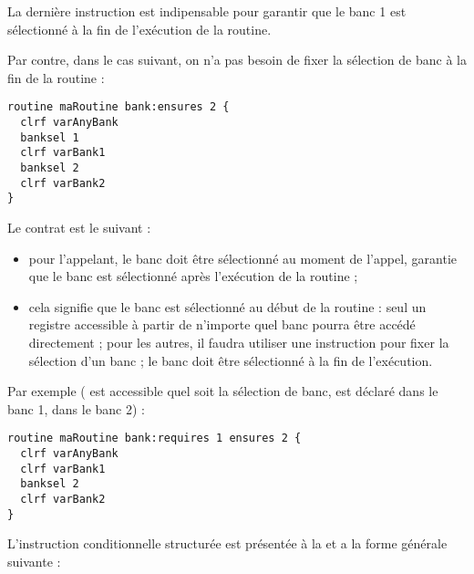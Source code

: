 La dernière instruction  est indipensable pour garantir que le banc 1 est sélectionné à la fin de l'exécution de la routine.


Par contre, dans le cas suivant, on n'a pas besoin de fixer la sélection de banc à la fin de la routine :
\begin{lstlisting}[language=piccolo]
routine maRoutine bank:ensures 2 {
  clrf varAnyBank
  banksel 1
  clrf varBank1
  banksel 2
  clrf varBank2
}
\end{lstlisting}













Le contrat est le suivant :
\begin{itemize}
  \item pour l'appelant, le banc  doit être sélectionné au moment de l'appel, garantie que le banc  est sélectionné après l'exécution de la routine ; 
  \item cela signifie que le banc  est sélectionné au début de la routine : seul un registre accessible à partir de n'importe quel banc pourra être accédé directement ; pour les autres, il faudra utiliser une instruction  pour fixer la sélection d'un banc ; le banc  doit être sélectionné à la fin de l'exécution.
\end{itemize}

Par exemple ( est accessible quel soit la sélection de banc,  est déclaré dans le banc 1,  dans le banc 2) :
\begin{lstlisting}[language=piccolo]
routine maRoutine bank:requires 1 ensures 2 {
  clrf varAnyBank
  clrf varBank1
  banksel 2
  clrf varBank2
}
\end{lstlisting}










L'instruction conditionnelle structurée est présentée à la  et a la forme générale suivante :

